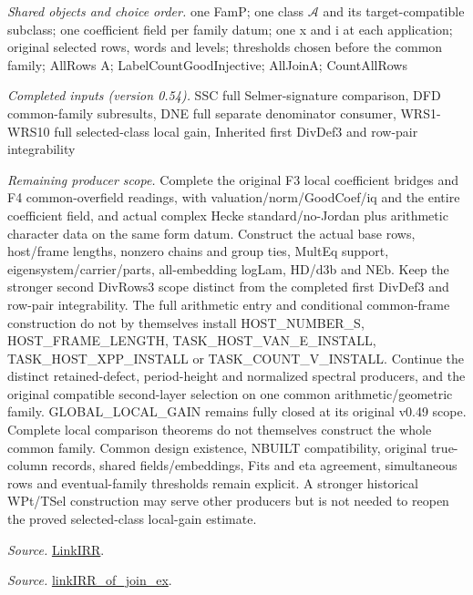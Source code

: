 \documentclass[11pt,a4paper]{article}
\numberwithin{equation}{section}
\theoremstyle{remark}\newtheorem{remark}[theorem]{Remark}
\begin{document}
\emph{Shared objects and choice order.} one FamP; one class $\mathcal A$ and its target-compatible subclass; one coefficient field per family datum; one x and i at each application; original selected rows, words and levels; thresholds chosen before the common family; AllRows A; LabelCountGoodInjective; AllJoinA; CountAllRows

\emph{Completed inputs (version 0.54).} SSC full Selmer-signature comparison, DFD common-family subresults, DNE full separate denominator consumer, WRS1-WRS10 full selected-class local gain, Inherited first DivDef3 and row-pair integrability

\emph{Remaining producer scope.} Complete the original F3 local coefficient bridges and F4 common-overfield readings, with valuation/norm/GoodCoef/iq and the entire coefficient field, and actual complex Hecke standard/no-Jordan plus arithmetic character data on the same form datum. Construct the actual base rows, host/frame lengths, nonzero chains and group ties, MultEq support, eigensystem/carrier/parts, all-embedding logLam, HD/d3b and NEb. Keep the stronger second DivRows3 scope distinct from the completed first DivDef3 and row-pair integrability. The full arithmetic entry and conditional common-frame construction do not by themselves install HOST\_\allowbreak NUMBER\_\allowbreak S, HOST\_\allowbreak FRAME\_\allowbreak LENGTH, TASK\_\allowbreak HOST\_\allowbreak VAN\_\allowbreak E\_\allowbreak INSTALL, TASK\_\allowbreak HOST\_\allowbreak XPP\_\allowbreak INSTALL or TASK\_\allowbreak COUNT\_\allowbreak V\_\allowbreak INSTALL. Continue the distinct retained-defect, period-height and normalized spectral producers, and the original compatible second-layer selection on one common arithmetic/geometric family. GLOBAL\_\allowbreak LOCAL\_\allowbreak GAIN remains fully closed at its original v0.49 scope. Complete local comparison theorems do not themselves construct the whole common family. Common design existence, NBUILT compatibility, original true-column records, shared fields/embeddings, Fits and eta agreement, simultaneous rows and eventual-family thresholds remain explicit. A stronger historical WPt/TSel construction may serve other producers but is not needed to reopen the proved selected-class local-gain estimate.

\emph{Source.} \href{https://github.com/CocoSgt/riemann-hypothesis-lean/blob/7cbf7a0c32fca1badf05931879a37c3f8a2b03b4/src/Formalism/SharpRestriction/GlobalTheoremInputs.lean#L55-L58}{LinkIRR}.

\emph{Source.} \href{https://github.com/CocoSgt/riemann-hypothesis-lean/blob/7cbf7a0c32fca1badf05931879a37c3f8a2b03b4/src/Development/AbelianVarietyTheory/Proofs/GlobalInterpolation/LinkIRROfJoinEx.lean#L17-L38}{linkIRR\_\allowbreak of\_\allowbreak join\_\allowbreak ex}.
\end{document}
